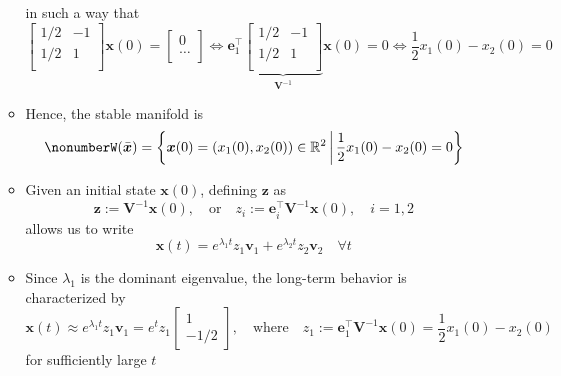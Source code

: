 \documentclass[12pt,a4paper]{article}
\begin{document}
\begin{itemize}
\begin{itemize}
      in such a way that
      \begin{equation}\nonumber%
      \begin{bmatrix}
        1/2 & -1 \\
        1/2 & 1 \\
      \end{bmatrix}
      \bm{x}(0)
      = 
      \begin{bmatrix}
        0 \\
        \ldots \\
      \end{bmatrix}
      \iff
      \bm{e}_{1}^{\top}
      \underbrace{\begin{bmatrix}
        1/2 & -1 \\
        1/2 & 1 \\
      \end{bmatrix}}_{\bm{V}^{-1}}
      \bm{x}(0) = 0
      \iff
      \frac{1}{2}x_{1}(0) - x_{2}(0) = 0
      \end{equation}
    \item Hence, the stable manifold is
      \begin{equation}\nonumber%
        W(\bar{\bm{x}}) = \left\{\bm{x}(0)=(x_{1}(0),x_{2}(0))\in \R^{2}\,\bigg|\, \frac{1}{2}x_{1}(0) - x_{2}(0) = 0\right\}
      \end{equation}
    \item Given an initial state $\bm{x}(0)$,
      defining $\bm{z}$ as
      \begin{equation}\nonumber%
        \bm{z} := \bm{V}^{-1}\bm{x}(0),
        \quad\text{or}\quad
        z_{i} := \bm{e}_{i}^{\top}\bm{V}^{-1}\bm{x}(0),
        \quad i = 1, 2
      \end{equation}
      allows us to write
    \begin{equation}\nonumber%
      \bm{x}(t)
      =
      e^{\lambda_{1}t}z_{1}\bm{v}_{1}
      +
      e^{\lambda_{2}t}z_{2}\bm{v}_{2}
      \quad \forall t
    \end{equation}
    \item Since $\lambda_{1}$ is the dominant eigenvalue,
      the long-term behavior is characterized by
    \begin{equation}\nonumber%
      \bm{x}(t)
      \approx
      e^{\lambda_{1}t}z_{1}\bm{v}_{1}
      =
      e^{t}z_{1}
      \begin{bmatrix}
        1 \\ -1/2
      \end{bmatrix},
      \quad\text{where}\quad
      z_{1}:=\bm{e}_{1}^{\top}\bm{V}^{-1}\bm{x}(0)
      = \frac{1}{2}x_{1}(0) - x_{2}(0)
    \end{equation}
    for sufficiently large $t$
  \end{itemize}


\end{itemize}
\end{document}
